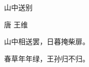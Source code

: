 \documentclass[UTF8]{ctexart}
\begin{document}
\begin{center}
\Huge 山中送别

\LARGE 唐 王维

\Large
山中相送罢，日暮掩柴扉。

春草年年绿，王孙归不归。
\end{center}
\end{document}
